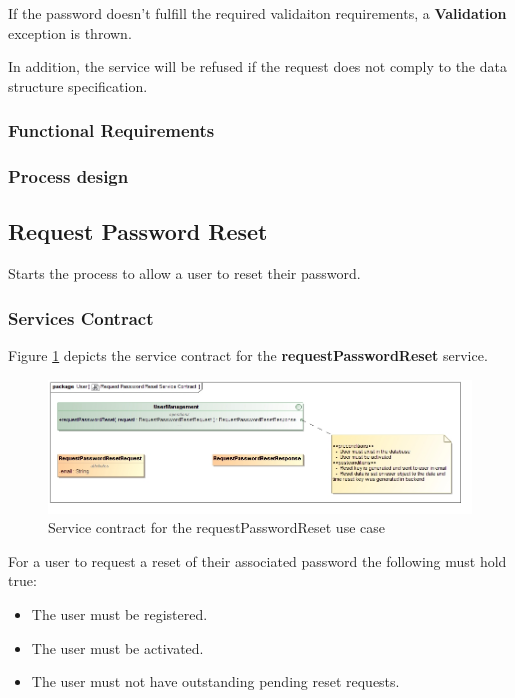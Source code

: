 If the password doesn't fulfill the required validaiton requirements, a \textbf{Validation} exception is thrown.

In addition, the service will be refused if the request does not comply to the data structure specification.

\subsubsection{Functional Requirements}

\subsubsection{Process design}

\subsection{Request Password Reset}
Starts the process to allow a user to reset their password.

\subsubsection{Services Contract}
Figure \ref{fig:requestPasswordResetServicesContract} depicts the service contract for the \textbf{requestPasswordReset} service.

\begin{figure}[H]
  \begin{center}
  \includegraphics[scale=0.55]{../Diagrams and Charts/Users/Request Password Reset Service Contract.jpg}
  \caption{Service contract for the requestPasswordReset use case}
  \end{center}
  \label{fig:requestPasswordResetServicesContract}
\end{figure}

For a user to request a reset of their associated password the following must hold true:
\begin{itemize}
	\item The user must be registered.
	\item The user must be activated.
	\item The user must not have outstanding pending reset requests.
\end{itemize}

